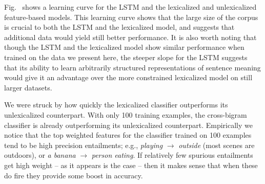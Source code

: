 Fig.~ shows a learning curve for the LSTM and the lexicalized and unlexicalized feature-based models. This learning curve shows that the large size of the corpus is crucial to both the LSTM and the lexicalized model, and suggests that additional data would yield still better performance. It is also worth noting that though the LSTM and the lexicalized model show similar performance when trained on the data we present here, the steeper slope for the LSTM suggests that its ability to learn arbitrarily structured representations of sentence meaning would give it an advantage over the more constrained lexicalized model on still larger datasets.



We were struck by how quickly the lexicalized classifier outperforms its unlexicalized counterpart.
With only 100 training examples, the cross-bigram classifier is already outperforming its unlexicalized counterpart.
Empirically we notice that the top weighted features for the classifier
  trained on 100 examples tend to be high precision entailments;
  e.g.,
  \textit{playing} $\rightarrow$ \textit{outside}
  (most scenes are outdoors), or \textit{a banana} $\rightarrow$
  \textit{person eating}.
If relatively few spurious entailments get high weight -- as it appears
  is the case -- then it makes sense that when these do fire they
  provide some boost in accuracy.
  
